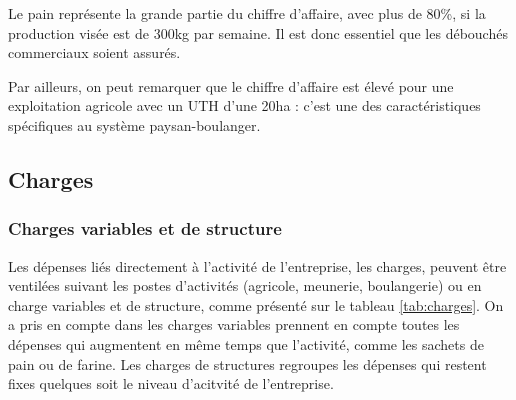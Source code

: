 \documentclass{book}
\begin{document}
Le pain représente la grande partie du chiffre d'affaire, avec plus de 80\%, si la production visée est de 300kg par semaine. Il est donc essentiel que les débouchés commerciaux soient assurés. 

Par ailleurs, on peut remarquer que le chiffre d'affaire est élevé pour une exploitation agricole avec un UTH d'une 20ha : c'est une des caractéristiques spécifiques au système paysan-boulanger. 

\subsection{Charges}

\subsubsection{Charges variables et de structure}

Les dépenses liés directement à l'activité de l'entreprise, les charges, peuvent être ventilées suivant les postes d'activités (agricole, meunerie, boulangerie) ou en charge variables et de structure, comme présenté sur le tableau \ref{tab:charges}. On a pris en compte dans les charges variables prennent en compte toutes les dépenses qui augmentent en même temps que l'activité, comme les sachets de pain ou de farine. Les charges de structures regroupes les dépenses qui restent fixes quelques soit le niveau d'acitvité de l'entreprise. 
\end{document}
